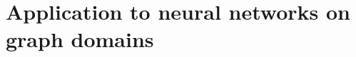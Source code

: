 \documentclass[12pt]{book}
\begin{document}

%
%


%
%

\dominitoc
\tableofcontents






%
%



%
%
 \setcounter{chapter}{2}
 \chapter{Application to neural networks on graph domains}
 \vfill\minitoc\newpage
 \newpage


 \newpage

%
%
\end{document}
